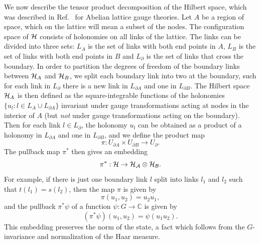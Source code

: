 \documentclass[aps,prd,twocolumn,showpacs,groupedaddress,nofootinbib,letterpaper]{revtex4}
\begin{document}
We now describe the tensor product decomposition of the Hilbert space, which was described in Ref.~\cite{Buividovich2008b} for Abelian lattice gauge theories.
Let $A$ be a region of space, which on the lattice will mean a subset of the nodes.
The configuration space of $\cal H$ consists of holonomies on all links of the lattice.
The links can be divided into three sets: $L_A$ is the set of links with both end points in $A$, $L_B$ is the set of links with both end points in $B$ and $L_{\partial}$ is the set of links that cross the boundary.                                                                                                                                                                               
In order to partition the degrees of freedom of the boundary links between ${\cal H}_A$ and ${\cal H}_B$, we split each boundary link into two at the boundary, such for each link in $L_{\partial}$ there is a new link in $L_{\partial A}$ and one in $L_{\partial B}$.
The Hilbert space ${\cal H}_A$ is then defined as the square-integrable functions of the holonomies $\{ u_l : l \in L_A \cup L_{\partial A} \}$ invariant under gauge transformations acting at nodes in the interior of $A$ (but \emph{not} under gauge transformations acting on the boundary).
Then for each link $l \in L_{\partial}$, the holonomy $u_l$ can be obtained as a product of a holonomy in $L_{\partial A}$ and one in $L_{\partial B}$, and we define the product map
\begin{equation}
\pi : U_{\partial A} \times U_{\partial B} \to U_{\partial}.
\end{equation}
The pullback map $\pi^*$ then gives an embedding
\begin{equation}
\pi^* : \cal H \to {\cal H}_A \otimes {\cal H}_B.
\end{equation}
For example, if there is just one boundary link $l$ split into links $l_1$ and $l_2$ such that $t(l_1) = s(l_2)$, then the map $\pi$ is given by
\begin{equation}
\pi(u_1, u_2) = u_2 u_1,
\end{equation}
and the pullback $\pi^*\psi$ of a function $\psi: G \to \mathbb{C}$ is given by
\begin{equation}
(\pi^* \psi) (u_1, u_2) = \psi(u_1 u_2).
\end{equation}
This embedding preserves the norm of the state, a fact which follows from the $G$-invariance and normalization of the Haar measure.
\end{document}
